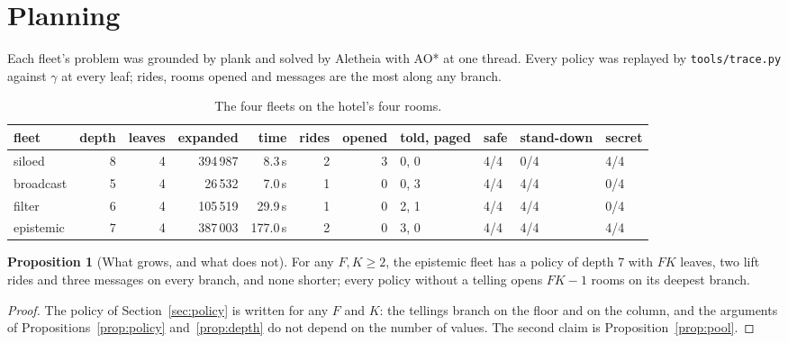 \documentclass[11pt,a4paper]{article}
\theoremstyle{definition}
\newtheorem{proposition}{Proposition}
\newcommand{\code}[1]{\texttt{\small #1}}
\begin{document}
\section{Planning}
\label{sec:planning}

Each fleet's problem was grounded by plank and solved by Aletheia with AO* at
one thread. Every policy was replayed by \code{tools/trace.py} against $\gamma$
at every leaf; rides, rooms opened and messages are the most along any branch.

\begin{table}[H]
\centering\footnotesize
\setlength{\tabcolsep}{4.5pt}
\begin{tabular}{@{}l r r r r r r l l l l@{}}
\toprule
fleet & depth & leaves & expanded & time & rides & opened & told, paged & safe & stand-down & secret \\
\midrule
siloed & 8 & 4 & 394\,987 & 8.3\,s & 2 & 3 & 0, 0 & 4/4 & 0/4 & 4/4 \\
broadcast & 5 & 4 & 26\,532 & 7.0\,s & 1 & 0 & 0, 3 & 4/4 & 4/4 & 0/4 \\
filter & 6 & 4 & 105\,519 & 29.9\,s & 1 & 0 & 2, 1 & 4/4 & 4/4 & 0/4 \\
epistemic & 7 & 4 & 387\,003 & 177.0\,s & 2 & 0 & 3, 0 & 4/4 & 4/4 & 4/4 \\
\bottomrule
\end{tabular}
\caption{The four fleets on the hotel's four rooms.}
\label{tab:planning}
\end{table}

\begin{proposition}[What grows, and what does not]
\label{prop:scale}
For any $F, K \geq 2$, the epistemic fleet has a policy of depth 7 with $FK$
leaves, two lift rides and three messages on every branch, and none shorter;
every policy without a telling opens $FK - 1$ rooms on its deepest branch.
\end{proposition}

\begin{proof}
The policy of Section~\ref{sec:policy} is written for any $F$ and $K$: the
tellings branch on the floor and on the column, and the arguments of
Propositions~\ref{prop:policy} and~\ref{prop:depth} do not depend on the number
of values. The second claim is Proposition~\ref{prop:pool}.
\end{proof}
\end{document}
